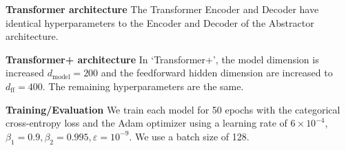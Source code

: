 \textbf{Transformer architecture} The Transformer Encoder and Decoder have identical hyperparameters to the Encoder and Decoder of the Abstractor architecture.

\textbf{Transformer+ architecture} In `Transformer+', the model dimension is increased $d_\mathrm{model} = 200$ and the feedforward hidden dimension are increased to $d_{\mathrm{ff}} = 400$. The remaining hyperparameters are the same.

\textbf{Training/Evaluation} We train each model for 50 epochs with the categorical cross-entropy loss and the Adam optimizer using a learning rate of $6 \times 10^{-4}$, $\beta_1 = 0.9, \beta_2 = 0.995, \varepsilon = 10^{-9}$. We use a batch size of 128.